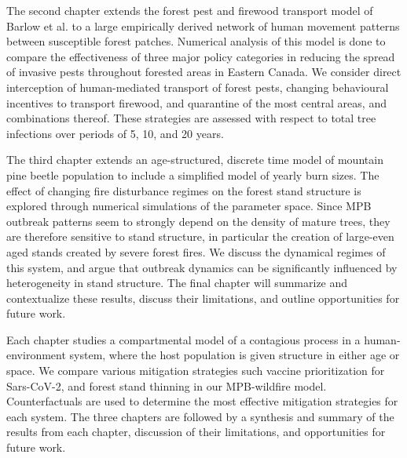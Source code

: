The second chapter extends the forest pest and firewood transport model of Barlow et al. \cite{barlow2014modelling} to a large empirically derived network of human movement patterns between susceptible forest patches. Numerical analysis of this model is done to compare the effectiveness of three major policy categories in reducing the spread of invasive pests throughout forested areas in Eastern Canada. We consider direct interception of human-mediated transport of forest pests, changing behavioural incentives to transport firewood, and quarantine of the most central areas, and combinations thereof. These strategies are assessed with respect to total tree infections over periods of 5, 10, and 20 years.

The third chapter extends an age-structured, discrete time model of mountain pine beetle population \cite{duncan2015model} to include a simplified model of yearly burn sizes. The effect of changing fire disturbance regimes on the forest stand structure is explored through numerical simulations of the parameter space. Since MPB outbreak patterns seem to strongly depend on the density of mature trees, they are therefore sensitive to stand structure, in particular the creation of large-even aged stands created by severe forest fires. We discuss the dynamical regimes of this system, and argue that outbreak dynamics can be significantly influenced by heterogeneity in stand structure. The final chapter will summarize and contextualize these results, discuss their limitations, and outline opportunities for future work.

Each chapter studies a compartmental model of a contagious process in a human-environment system, where the host population is given structure in either age or space. We compare various mitigation strategies such vaccine prioritization for Sars-CoV-2, and forest stand thinning in our MPB-wildfire model. Counterfactuals are used to determine the most effective mitigation strategies for each system. The three chapters are followed by a synthesis and summary of the results from each chapter, discussion of their limitations, and opportunities for future work. 
